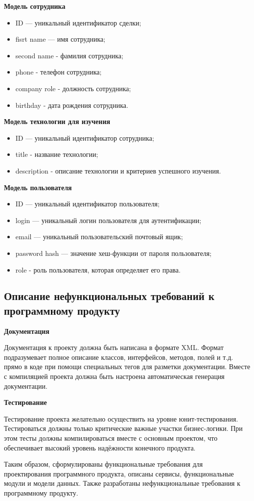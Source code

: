 \bigskip
\textbf{Модель сотрудника}

\begin{itemize}
    \item ID — уникальный идентификатор сделки;
    \item fisrt name — имя сотрудника;
    \item second name - фамилия сотрудника;
    \item phone - телефон сотрудника;
    \item company role - должность сотрудника;
    \item birthday - дата рождения сотрудника.
\end{itemize}

\bigskip
\textbf{Модель технологии для изучения}

\begin{itemize}
    \item ID — уникальный идентификатор сотрудника;
    \item title - название технологии;
    \item description - описание технологии и критериев успешного изучения.
\end{itemize}

\bigskip
\textbf{Модель пользователя}

\begin{itemize}
    \item ID — уникальный идентификатор пользователя;
    \item login — уникальный логин пользователя для аутентификации;
    \item email — уникальный пользовательский почтовый ящик;
    \item password hash — значение хеш-функции от пароля пользователя;
    \item role - роль пользователя, которая определяет его права.
\end{itemize}

\subsection{Описание нефункциональных требований к программному продукту}\label{sec:domain:nonfunc}

\textbf{Документация}

Документация к проекту должна быть написана в формате XML. Формат подразумевает полное описание классов, интерфейсов, методов, полей и т.д. прямо в коде при помощи специальных тегов для разметки документации. Вместе с компиляцией проекта должна быть настроена автоматическая генерация документации.

\bigskip
\textbf{Тестирование}

Тестирование проекта желательно осуществить на уровне юнит-тести\-рования. Тестироваться должны только критические важные участки бизнес-логики. При этом тесты должны компилироваться вместе с основным проектом, что обеспечивает высокий уровень надёжности конечного продукта.

Таким образом, сформулированы функциональные требования для проектирования программного продукта, описаны сервисы, функциональные модули и модели данных. Также разработаны нефункциональные требования к программному продукту.

